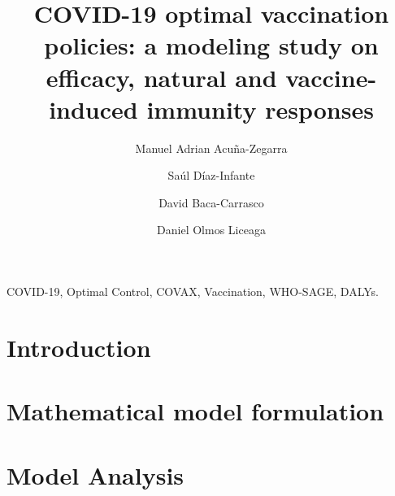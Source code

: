 \documentclass[3p, sort&compress]{elsarticle}
\begin{document}
    \begin{frontmatter}
        \title{
            COVID-19 optimal vaccination policies:
            a modeling study on efficacy, natural and
            vaccine-induced immunity responses
        }
        \author[add:unison]%
        {Manuel Adrian Acu\~na-Zegarra}
        \address[add:unison]{
            Departamento de Matem\'aticas, Universidad de Sonora,
            Blvd. Luis Encinas y Rosales S/N,
            Hermosillo, Sonora, M\'exico, C.P. 83000.
        }
        \author[add:conacyt_unison]{%
            Sa\'ul D\'iaz-Infante%
        }%
        \address[add:conacyt_unison]{
            CONACYT-Universidad de Sonora,
            Departamento de Matem\'aticas,
            Blvd. Luis Encinas y Rosales S/N,
            Hermosillo, Sonora, M\'exico, C.P. 83000.
        }
        \author[add:itson]%
        {David Baca-Carrasco}
        \address[add:itson]{
            Departamento de Matem\'aticas, Instituto Tecnol\'ogico de
            Sonora, 5 de Febrero 818 Sur, Colonia Centro, Ciudad
            Obregón,
            Sonora, M\'exico, C.P. 85000.
        }
        \author[add:unison]%
        {Daniel Olmos Liceaga}
        \begin{keyword}
            COVID-19, Optimal Control, COVAX,
            Vaccination, WHO-SAGE, DALYs.
        \end{keyword}
        
    \end{frontmatter}
    \section{Introduction}
    
    \section{Mathematical model formulation}
    \label{Sec:MathematicalModelFormulation}
    
    \section{Model Analysis}
    \label{Sec:Rv_Analysis}
    
\end{document}
